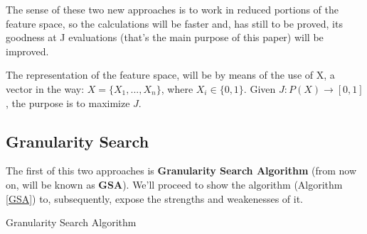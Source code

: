 \documentclass{article}
\begin{document}
The sense of these two new approaches is to work in reduced portions of the feature space, so the calculations will be faster and, has still to be proved, its goodness at J evaluations (that's the main purpose of this paper) will be improved.

The representation of the feature space, will be by means of the use of X, a vector in the way: $X=\{X_1,...,X_n\}$, where $X_i \in \{0,1\}$. Given $J:P(X) \rightarrow[0,1]$, the purpose is to maximize $J$.

\subsection{Granularity Search}
The first of this two approaches is \textbf{Granularity Search Algorithm} (from now on, will be known as \textbf{GSA}). We'll proceed to show the algorithm (Algorithm \ref{GSA}) to, subsequently, expose the strengths and weakenesses of it.


\begin{algorithm}
\dontprintsemicolon
{}
\caption{Granularity Search Algorithm\label{GSA}}
\end{algorithm}
\end{document}

